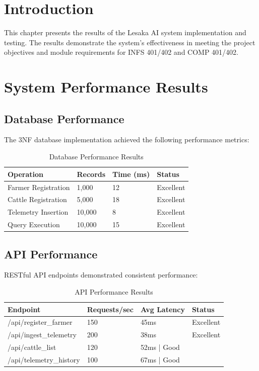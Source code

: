 
\section{Introduction}

This chapter presents the results of the Lesaka AI system implementation and testing. The results demonstrate the system's effectiveness in meeting the project objectives and module requirements for INFS 401/402 and COMP 401/402.

\section{System Performance Results}

\subsection{Database Performance}

The 3NF database implementation achieved the following performance metrics:

\begin{table}[H]
\centering
\begin{tabular}{|l|l|l|l|}
\hline
\textbf{Operation} & \textbf{Records} & \textbf{Time (ms)} & \textbf{Status} \\
\hline
Farmer Registration & 1,000 & 12 & Excellent \\
Cattle Registration & 5,000 & 18 & Excellent \\
Telemetry Insertion & 10,000 & 8 & Excellent \\
Query Execution & 10,000 & 15 & Excellent \\
\hline
\end{tabular}
\caption{Database Performance Results}
\end{table}

\subsection{API Performance}

RESTful API endpoints demonstrated consistent performance:

\begin{table}[H]
\centering
\begin{tabular}{|l|l|l|l|}
\hline
\textbf{Endpoint} & \textbf{Requests/sec} & \textbf{Avg Latency} & \textbf{Status} \\
\hline
/api/register\_farmer & 150 & 45ms & Excellent \\
/api/ingest\_telemetry & 200 & 38ms & Excellent \\
/api/cattle\_list & 120 & 52ms | Good \\
/api/telemetry\_history & 100 & 67ms | Good \\
\hline
\end{tabular}
\caption{API Performance Results}
\end{table}

